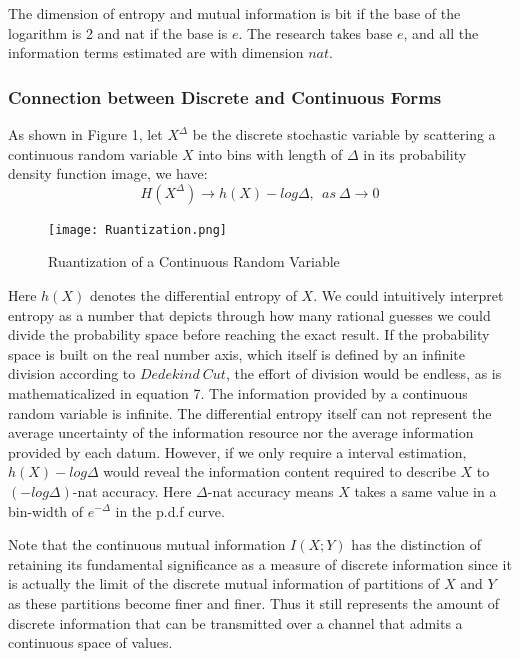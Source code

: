 \documentclass[11pt]{article}
\begin{document}
The dimension of entropy and mutual information is bit if the base of the logarithm is 2 and nat if the base is $e$. The research takes base $e$, and all the information terms estimated are with dimension $nat$.
\subsubsection{Connection between Discrete and Continuous Forms}

As shown in Figure 1, let $X^\Delta$ be the discrete stochastic variable by scattering a continuous random variable $X$ into bins with length of $\Delta$ in its probability density function image, we have:
\begin{equation}
H(X^\Delta)\to h(X)-log\Delta,~~as ~\Delta \to 0
\end{equation}
\begin{figure}[H]
\centering
\texttt{[image: Ruantization.png]}
\caption{Ruantization of a Continuous Random Variable\cite{cover2012elements}}
\end{figure}
Here $h(X)$ denotes the differential entropy of $X$. We could intuitively interpret entropy as a number that depicts through how many rational guesses we could divide the probability space before reaching the exact result. If the probability space is built on the real number axis, which itself is defined by an infinite division according to $Dedekind~Cut$, the effort of division would be endless, as is mathematicalized in equation 7. The information provided by a continuous random variable is infinite. The differential entropy itself can not represent the average uncertainty of the information resource nor the average information provided by each datum. However, if we only require a interval estimation, $h(X)-log\Delta $ would reveal the information content required to describe $X$ to $(-log\Delta)$-nat accuracy\cite{cover2012elements}.  Here $\Delta$-nat accuracy means $X$ takes a same value in a bin-width of $e^{-\Delta}$ in the p.d.f curve. 



Note that the continuous mutual information $I(X;Y)$ has the distinction of retaining its fundamental significance as a measure of discrete information since it is actually the limit of the discrete mutual information of partitions of $X$ and $Y$ as these partitions become finer and finer. Thus it  still represents the amount of discrete information that can be transmitted over a channel that admits a continuous space of values. 
\end{document}
